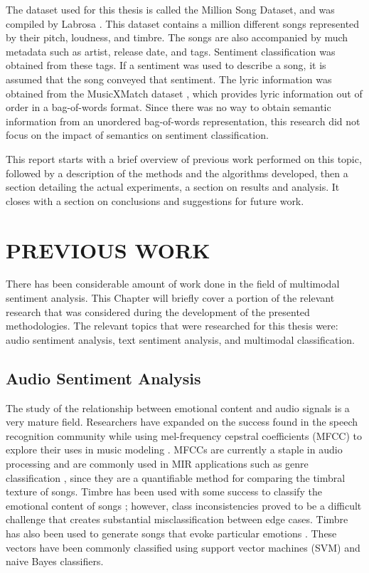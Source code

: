  The dataset used for this thesis is called the Million Song Dataset, and 
  was compiled by Labrosa \cite{Bertin-Mahieux2011}. This dataset contains a million different songs
  represented by their pitch, loudness, and timbre. The songs are also accompanied 
  by much metadata such as artist, release date, and  tags. Sentiment classification
   was obtained from these tags. If a sentiment was used to describe a song, it is assumed that 
  the song conveyed that sentiment. The lyric information was obtained from the
  MusicXMatch dataset  \cite{musicXmatchDataset}, which provides lyric information out of order in a 
  bag-of-words format. Since there was no way to obtain semantic information 
  from an unordered bag-of-words representation, this research did not focus 
  on the impact of semantics on sentiment classification. 
      
 This report starts with a brief overview of previous work performed on this 
 topic, followed by a description of the methods and the algorithms developed,
 then a section detailing the actual experiments,  a section on results and  analysis.
 It closes with a section on conclusions and suggestions for future work.
 
 \chapter{PREVIOUS WORK}

There has been considerable amount of work done in the field of multimodal 
sentiment analysis. This Chapter will briefly cover a portion of the relevant 
research that was considered during the development of the presented 
methodologies. The relevant topics that were researched for this thesis were: audio sentiment 
analysis, text sentiment analysis, and multimodal classification.


\section*{Audio Sentiment Analysis}

The study of the relationship between emotional content and audio signals is a 
very mature field. Researchers have expanded on the success found in the 
speech recognition community while using mel-frequency cepstral coefficients 
(MFCC) to explore their uses in music modeling \cite{Logan00melfrequency}. MFCCs are currently a 
staple in audio processing and are commonly used in MIR applications such 
as genre classification \cite{Tzanetakis01automaticmusical}, since they are a quantifiable method for comparing the 
timbral texture of songs. Timbre has been used with some success to classify the 
emotional content of songs \cite{University03detectingemotion}; however, class inconsistencies proved to be 
a difficult challenge that creates substantial misclassification between edge cases. 
Timbre has also been used to generate songs that evoke particular emotions \cite{transprose}.  
These vectors have been commonly classified using 
support vector machines (SVM) and naive Bayes classifiers. 

